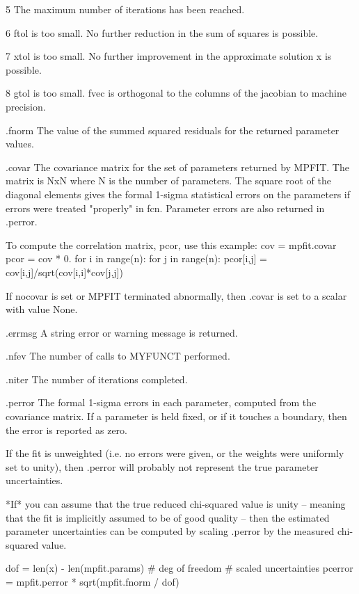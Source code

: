 \begin{DoxyVerb}
5  The maximum number of iterations has been reached.

6  ftol is too small. No further reduction in the sum of squares is
   possible.

7  xtol is too small. No further improvement in the approximate solution
   x is possible.

8  gtol is too small. fvec is orthogonal to the columns of the jacobian
   to machine precision.

     .fnorm
The value of the summed squared residuals for the returned parameter
values.

     .covar
The covariance matrix for the set of parameters returned by MPFIT.
The matrix is NxN where N is the number of  parameters.  The square root
of the diagonal elements gives the formal 1-sigma statistical errors on
the parameters if errors were treated "properly" in fcn.
Parameter errors are also returned in .perror.

To compute the correlation matrix, pcor, use this example:
   cov = mpfit.covar
   pcor = cov * 0.
   for i in range(n):
      for j in range(n):
 pcor[i,j] = cov[i,j]/sqrt(cov[i,i]*cov[j,j])

If nocovar is set or MPFIT terminated abnormally, then .covar is set to
a scalar with value None.

     .errmsg
A string error or warning message is returned.

     .nfev
The number of calls to MYFUNCT performed.

     .niter
The number of iterations completed.

     .perror
The formal 1-sigma errors in each parameter, computed from the
covariance matrix.  If a parameter is held fixed, or if it touches a
boundary, then the error is reported as zero.

If the fit is unweighted (i.e. no errors were given, or the weights
were uniformly set to unity), then .perror will probably not represent
the true parameter uncertainties.

*If* you can assume that the true reduced chi-squared value is unity --
meaning that the fit is implicitly assumed to be of good quality --
then the estimated parameter uncertainties can be computed by scaling
.perror by the measured chi-squared value.

   dof = len(x) - len(mpfit.params) # deg of freedom
   # scaled uncertainties
   pcerror = mpfit.perror * sqrt(mpfit.fnorm / dof)\end{DoxyVerb}
 

